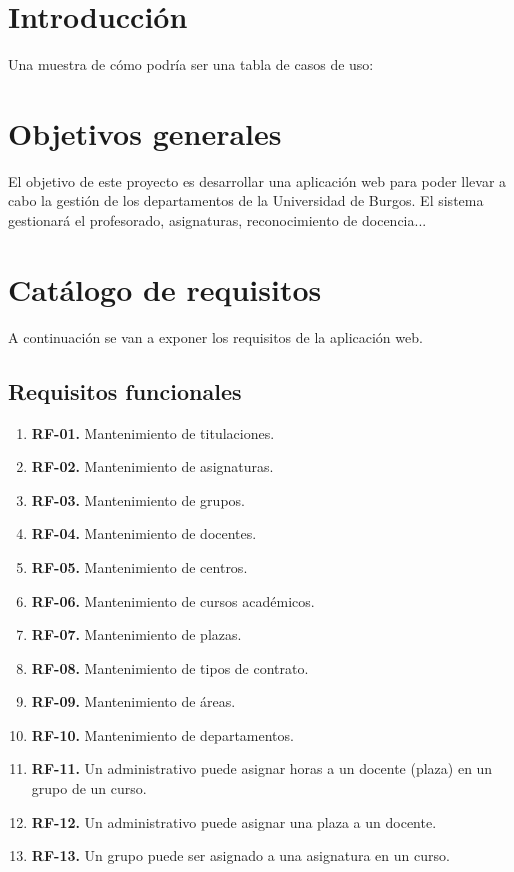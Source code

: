 
\section{Introducción}
Una muestra de cómo podría ser una tabla de casos de uso:


\section{Objetivos generales}
El objetivo de este proyecto es desarrollar una aplicación web para poder llevar a cabo la gestión de los departamentos de la Universidad de Burgos. El sistema gestionará el profesorado, asignaturas, reconocimiento de docencia...

\section{Catálogo de requisitos}
A continuación se van a exponer los requisitos de la aplicación web.
\subsection{Requisitos funcionales}
\begin{enumerate}
	\item \textbf{RF-01.} Mantenimiento de titulaciones.\label{itm:RF1}
	\item \textbf{RF-02.} Mantenimiento de asignaturas.\label{itm:RF2}
	\item \textbf{RF-03.} Mantenimiento de grupos.\label{itm:RF3}
	\item \textbf{RF-04.} Mantenimiento de docentes.\label{itm:RF4}
	\item \textbf{RF-05.} Mantenimiento de centros.\label{itm:RF5}
	\item \textbf{RF-06.} Mantenimiento de cursos académicos.\label{itm:RF6}
	\item \textbf{RF-07.} Mantenimiento de plazas.\label{itm:RF7}
	\item \textbf{RF-08.} Mantenimiento de tipos de contrato.\label{itm:RF8}
	\item \textbf{RF-09.} Mantenimiento de áreas.\label{itm:RF9}
	\item \textbf{RF-10.} Mantenimiento de departamentos.\label{itm:RF10}
	\item \textbf{RF-11.} Un administrativo puede asignar horas a un docente (plaza) en un grupo de un curso.\label{itm:RF11}
	\item \textbf{RF-12.} Un administrativo puede asignar una plaza a un docente.\label{itm:RF12}
	\item \textbf{RF-13.} Un grupo puede ser asignado a una asignatura en un curso.\label{itm:RF13}
\end{enumerate}

